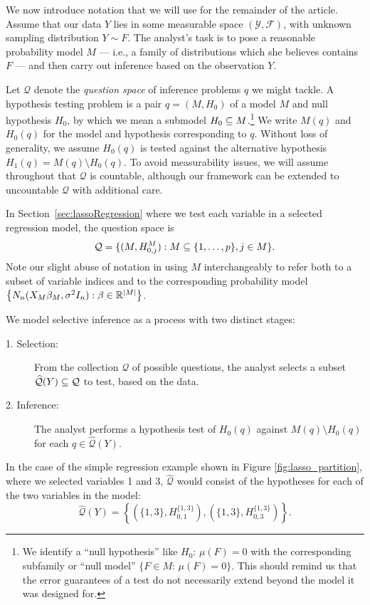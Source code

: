 \documentclass{article}
\theoremstyle{definition}
\newcommand{\cQ}{\mathcal{Q}}
\newcommand{\cY}{\mathcal{Y}}
\newcommand{\hcQ}{\widehat{\mathcal{Q}}}
\newcommand{\sF}{\mathscr{F}}
\begin{document}
We now introduce notation that we will use for the remainder of the article. Assume that our data $Y$ lies in some measurable space $(\cY, \sF)$, with unknown sampling distribution $Y\sim F$. The analyst's task is to pose a reasonable probability model $M$ --- i.e., a family of distributions which she believes contains $F$ --- and then carry out inference based on the observation $Y$.

Let $\cQ$ denote the {\em question space} of inference problems $q$ we might tackle. A hypothesis testing problem is a pair $q=(M,H_0)$ of a model $M$ and null hypothesis $H_0$, by which we mean a submodel $H_0\subseteq M$.\footnote{We identify a ``null hypothesis'' like $H_0:\,\mu(F)=0$ with the corresponding subfamily or ``null model'' ${\{F\in M:\, \mu(F)=0\}}$. This should remind us that the error guarantees of a test do not necessarily extend beyond the model it was designed for.} We write $M(q)$ and $H_0(q)$ for the model and hypothesis corresponding to $q$. Without loss of generality, we assume $H_0(q)$ is tested against the alternative hypothesis $H_1(q)=M(q)\setminus H_0(q)$. To avoid measurability issues, we will assume throughout that $\cQ$ is countable, although our framework can be extended to uncountable $\cQ$ with additional care.

In Section~\ref{sec:lassoRegression} where we test each variable in a selected regression model, the question space is
\[ \cQ = \{ (M, H^M_{0, j}): M \sub \{1, \ldots, p\}, j \in M \}. \]
Note our slight abuse of notation in using $M$ interchangeably to refer both to a subset of variable indices and to the corresponding probability model $\left\{N_n(X_M\beta_M, \sigma^2I_n): \beta\in\mathbb{R}^{|M|}\right\}$.


We model selective inference as a process with two distinct stages:
\begin{description}
\item[1. Selection:] From the collection $\cQ$ of possible questions, the analyst selects a subset $\hcQ(Y)\sub \cQ$ to test, based on the data.
\item[2. Inference:] The analyst performs a hypothesis test of $H_0(q)$ against $M(q)\setminus H_0(q)$ for each $q \in \hcQ(Y)$.
\end{description}

In the case of the simple regression example shown in Figure \ref{fig:lasso_partition}, where we selected variables 1 and 3, $\hcQ$ would consist of the hypotheses for each of the two variables in the model:
\[ \hcQ(Y) = \left\{ \left(\{1, 3\}, H^{\{1, 3\}}_{0, 1}\right), \left(\{1, 3\}, H^{\{1, 3\}}_{0, 3}\right) \right\}. \]
\end{document}
